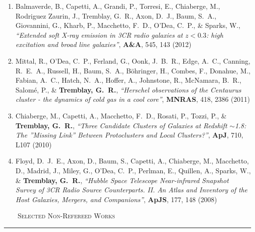 \documentclass[11pt]{article}
\makeatletter
\def\vhrulefill#1{\leavevmode\leaders\hrule\@height#1\hfill \kern\z@}
\makeatother
\begin{document}
\begin{enumerate}[resume]
\item Balmaverde, B., Capetti, A., Grandi, P., Torresi, E., Chiaberge, M.,
Rodriguez Zaurin, J., Tremblay, G.~R., Axon, D.~J., Baum, S.~A.,
Giovannini, G., Kharb, P., Macchetto, F.~D., O'Dea, C.~P.,
\& Sparks, W., \textit{``Extended soft X-ray emission in 3CR radio galaxies at $z< 0.3$: high excitation and broad line galaxies''}, \textbf{A\&A}, 545,  143 (2012)




\item Mittal, R., O'Dea, C.~P., Ferland, G., Oonk, J.~B.~R., Edge, A.~C.,
Canning, R.~E.~A., Russell, H., Baum, S.~A., B{\"o}hringer, H., Combes, F.,
Donahue, M., Fabian, A.~C., Hatch, N.~A., Hoffer, A., Johnstone, R.,
McNamara, B.~R., Salom{\'e}, P.,
\& \textbf{Tremblay, G.~R.}, \textit{``Herschel observations of the Centaurus cluster - the dynamics of cold gas in a cool core''}, \textbf{MNRAS}, 418,  2386 (2011)




\item Chiaberge, M., Capetti, A., Macchetto, F.~D., Rosati, P., Tozzi, P.,
\& \textbf{Tremblay, G.~R.}, \textit{``Three Candidate Clusters of Galaxies at Redshift $\sim$1.8: The ''Missing Link'' Between Protoclusters and Local Clusters?''}, \textbf{ApJ}, 710,  L107 (2010)





\item Floyd, D.~J.~E., Axon, D., Baum, S., Capetti, A., Chiaberge, M.,
Macchetto, D., Madrid, J., Miley, G., O'Dea, C.~P., Perlman, E., Quillen,
A., Sparks, W.,
\& \textbf{Tremblay, G.~R.},  \textit{``Hubble Space Telescope Near-infrared Snapshot Survey of 3CR Radio Source Counterparts. II. An Atlas and Inventory of the Host Galaxies, Mergers, and Companions''}, \textbf{ApJS}, 177,  148 (2008)

\end{enumerate}



\noindent \textsc{ ~~~~Selected Non-Refereed Works} \vhrulefill{0.4pt}
\end{document}
